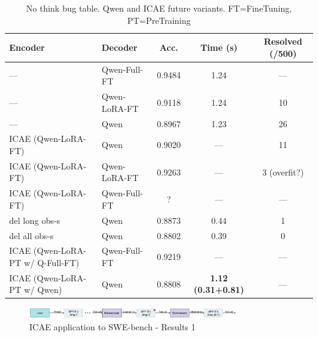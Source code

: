 \begin{table}[h]
    \centering
    \small
    \setlength{\tabcolsep}{4pt}
    \begin{tabular}{|ll|ccc|}
        \hline
        \textbf{Encoder} & \textbf{Decoder} & \textbf{Acc.} & \textbf{Time (s)} & \textbf{Resolved (/500)} \\
        \hline
        —                         & Qwen-Full-FT   & 0.9484 & 1.24                      & —         \\
        —                         & Qwen-LoRA-FT   & 0.9118 & 1.24                      & 10        \\
        —                         & Qwen           & 0.8967 & 1.23                      & 26        \\
        \hline
        ICAE (Qwen-LoRA-FT)       & Qwen           & 0.9020 & —                         & 11        \\
        ICAE (Qwen-LoRA-FT)       & Qwen-LoRA-FT   & 0.9263 & —                         & 3 (overfit?) \\
        ICAE (Qwen-LoRA-FT)       & Qwen-Full-FT   & ?      & —                         & —         \\
        \hline
        del long obs-s            & Qwen           & 0.8873 & 0.44                      & 1         \\
        del all obs-s             & Qwen           & 0.8802 & 0.39                      & 0         \\
        \hline
        ICAE (Qwen-LoRA-PT w/ Q-Full-FT) & Qwen-Full-FT   & 0.9219 & —                         & —         \\
        ICAE (Qwen-LoRA-PT w/ Qwen)      & Qwen           & 0.8808 & \textbf{1.12 (0.31+0.81)} & —         \\
        \hline
    \end{tabular}
    \caption{No think bug table. Qwen and ICAE future variants. FT=FineTuning, PT=PreTraining}
    \label{tab:qwen_icae_variants_absolute}
\end{table}

\begin{figure}[hbt]
  \centering
  \includegraphics[width=0.8\textwidth]{graphs/mega-1.jpeg}
  \caption{ICAE application to SWE-bench - Results 1}
  \label{fig:mega1}
\end{figure}


